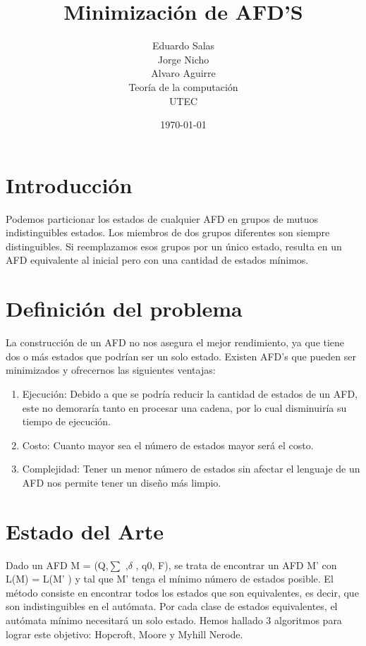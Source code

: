 \documentclass[12pt]{article}
\title{Minimizaci\'on de AFD'S}
\author{Eduardo Salas\\ 
Jorge Nicho\\
Alvaro Aguirre\\
Teor\'ia de la computaci\'on\\ 
\textsc{UTEC}
}
\date{\today}
\begin{document}
\setlength{\droptitle}{-5em}    
\maketitle


\section*{Introducci\'on}
Podemos particionar los estados de cualquier AFD en grupos de mutuos indistinguibles estados. Los miembros de dos grupos diferentes son siempre distinguibles.  Si reemplazamos esos grupos por un \'unico estado, resulta en un AFD equivalente al inicial pero con una cantidad de estados m\'inimos.\\
\section*{Definici\'on del problema}

La construcci\'on de un AFD no nos asegura el mejor rendimiento, ya que tiene dos o m\'as estados que podr\'ian ser un solo estado. Existen AFD’s que pueden ser minimizados y ofrecernos las siguientes ventajas:
\begin{enumerate}
    \item Ejecuci\'on: Debido a que se podr\'ia reducir la cantidad de estados de un AFD, este no demorar\'ia tanto en procesar una cadena, por lo cual disminuir\'ia su tiempo de ejecuci\'on.
    \item Costo: Cuanto mayor sea el n\'umero de estados mayor ser\'a el costo.
    \item Complejidad: Tener un menor n\'umero de estados sin afectar el lenguaje de un AFD nos permite tener un dise\~no m\'as limpio.
\end{enumerate}

\section{Estado del Arte}

Dado un AFD M = (Q,$\sum$ ,$\delta$ , q0, F), se trata de encontrar un AFD M' con L(M) = L(M' )   y tal que M' tenga el m\'inimo n\'umero de estados posible.
El m\'etodo consiste en encontrar todos los estados que son equivalentes, es decir, que son indistinguibles en el aut\'omata. Por cada clase de estados equivalentes, el aut\'omata m\'inimo necesitar\'a un solo estado.
Hemos hallado 3 algoritmos para lograr este objetivo: Hopcroft, Moore y Myhill Nerode.
\end{document}

